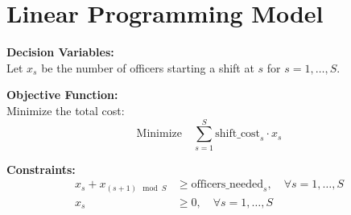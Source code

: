 \documentclass{article}
\begin{document}
\section*{Linear Programming Model}

\textbf{Decision Variables:} \\
Let \( x_s \) be the number of officers starting a shift at \( s \) for \( s = 1, \ldots, S \).

\textbf{Objective Function:} \\
Minimize the total cost:
\[
\text{Minimize} \quad \sum_{s=1}^{S} \text{shift\_cost}_s \cdot x_s
\]

\textbf{Constraints:}
\begin{align*}
x_s + x_{(s+1) \mod S} & \geq \text{officers\_needed}_s, \quad \forall s = 1, \ldots, S \\
x_s & \geq 0, \quad \forall s = 1, \ldots, S
\end{align*}
\end{document}
